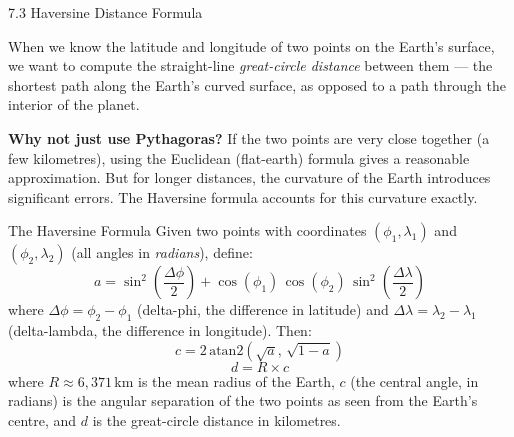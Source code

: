 \documentclass[aspectratio=169,10pt]{beamer}
\begin{document}
\begin{frame}[allowframebreaks]{7.3 Haversine Distance Formula}

  When we know the latitude and longitude of two points on the Earth's
  surface, we want to compute the straight-line \emph{great-circle
  distance} between them --- the shortest path along the Earth's
  curved surface, as opposed to a path through the interior of the
  planet.

  \textbf{Why not just use Pythagoras?}
  If the two points are very close together (a few kilometres), using
  the Euclidean (flat-earth) formula gives a reasonable approximation.
  But for longer distances, the curvature of the Earth introduces
  significant errors.  The Haversine formula accounts for this
  curvature exactly.

  \begin{block}{The Haversine Formula}
    Given two points with coordinates
    $(\phi_1, \lambda_1)$ and $(\phi_2, \lambda_2)$
    (all angles in \emph{radians}), define:
    \[
      a = \sin^2\!\!\left(\frac{\Delta\phi}{2}\right)
          + \cos(\phi_1)\,\cos(\phi_2)\,\sin^2\!\!\left(\frac{\Delta\lambda}{2}\right)
    \]
    where
    $\Delta\phi = \phi_2 - \phi_1$ (delta-phi, the difference in latitude)
    and
    $\Delta\lambda = \lambda_2 - \lambda_1$ (delta-lambda, the difference
    in longitude).  Then:
    \[
      c = 2\,\mathrm{atan2}\!\left(\sqrt{a},\, \sqrt{1-a}\right)
    \]
    \[
      d = R \times c
    \]
    where $R \approx 6{,}371$\,km is the mean radius of the Earth,
    $c$ (the central angle, in radians) is the angular separation
    of the two points as seen from the Earth's centre,
    and $d$ is the great-circle distance in kilometres.
  \end{block}

  \framebreak


\end{frame}
\end{document}
